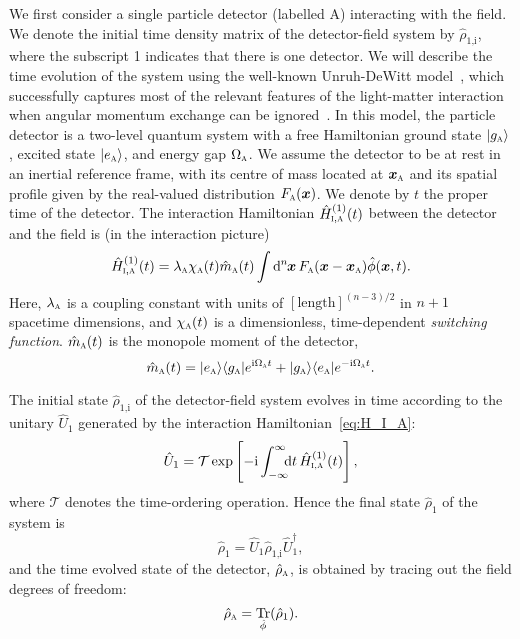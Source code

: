 \documentclass[pra,nofootinbib,floats,aps,twocolumn,tightenlines,superscriptaddress]{revtex4-1}
\DeclareMathOperator{\Tr}{Tr}
\renewcommand*\d[2][]{%
	\mathrm{d}%
	\ifx\relax#1\relax\else
	\rule{-0.02em}{1.5ex}^{#1}\rule{0.08em}{0ex}\!
	\fi
	#2\,
}
\newcommand{\ket}[1]{| {#1} \rangle}
\newcommand{\bra}[1]{\langle {#1} |}
\newcommand{\ii}{\mathrm{i}}
\begin{document}
We first consider a single particle  detector (labelled A) interacting with the field. We denote the initial time density matrix of the detector-field system by $\hat{\rho}_\text{1,i}$, where the subscript 1 indicates that there is one detector. We will describe the time evolution of the system using the well-known Unruh-DeWitt model~\cite{DeWitt1979}, which successfully captures most of the relevant features of the light-matter interaction when angular momentum exchange can be ignored~\cite{Martinez2013,Alhambra2014,Pozas2016}. In this model, the particle detector is a two-level quantum system with a free Hamiltonian ground state $\ket{g_\textsc{a}}$, excited state $\ket{e_\textsc{a}}$, and energy gap $\Omega_\textsc{a}$. We assume the detector to be at rest in an inertial reference frame, with its centre of mass located at $\bm{x}_\textsc{a}$ and its spatial profile given by the real-valued distribution $F_\textsc{a}(\bm x)$. We denote by $t$ the proper time of the detector. The interaction Hamiltonian $\hat{H}_{\textsc{i},\textsc{a}}^{(1)}(t)$ between the detector and the field is (in the interaction picture)
\begin{equation}
\label{eq:H_I_A}
	\hat{H}_{\textsc{i},\textsc{a}}^{(1)}(t)
	=
	\lambda_\textsc{a} \chi_\textsc{a}(t) \hat{m}_\textsc{a}(t)
	\int \d[n]{\bm{x}} F_\textsc{a}(\bm{x}-\bm{x}_\textsc{a}) \hat{\phi}(\bm{x},t).
\end{equation}
Here, $\lambda_\textsc{a}$ is a coupling constant with units of $[\text{length}]^{(n-3)/2}$ in $n+1$ spacetime dimensions, and $\chi_\textsc{a}(t)$ is a dimensionless, time-dependent \textit{switching function}. $\hat{m}_\textsc{a}(t)$ is the monopole moment of the detector,
\begin{equation}
\label{eq:m_A}
	\hat{m}_\textsc{a}(t)
	=
	\ket{e_\textsc{a}}\bra{g_\textsc{a}} e^{\ii\Omega_\textsc{a} t}+
	\ket{g_\textsc{a}}\bra{e_\textsc{a}} e^{-\ii\Omega_\textsc{a} t}.
\end{equation}

The initial state $\hat{\rho}_\text{1,i}$ of the detector-field system evolves in time according to the unitary $\hat{U}_1$ generated by the interaction Hamiltonian~\eqref{eq:H_I_A}:
\begin{equation}
\label{eq:U_1}
	\hat{U}_1
	=
	\mathcal{T}\exp\left[{-\ii\int_{-\infty}^{\infty}\!\!\!\dif t\, \hat{H}_\textsc{i,a}^{(1)}(t)}\right],
\end{equation}
where $\mathcal{T}$ denotes the time-ordering operation. Hence the final state $\hat{\rho}_1$ of the system is 
\begin{equation}
\label{eq:rho_a_def}
	\hat{\rho}_1=
	\hat{U}_1 \hat{\rho}_\text{1,i} \hat{U}_1^\dagger,
\end{equation}
and the time evolved state of the detector, $\hat{\rho}_\textsc{a}$, is obtained by tracing out the field degrees of freedom:
\begin{equation}
\label{eq:rho_a_v1}
	\hat{\rho}_\textsc{a}
	=
	\Tr_{\hat{\phi}}(\hat{\rho}_1).
\end{equation}
\end{document}

